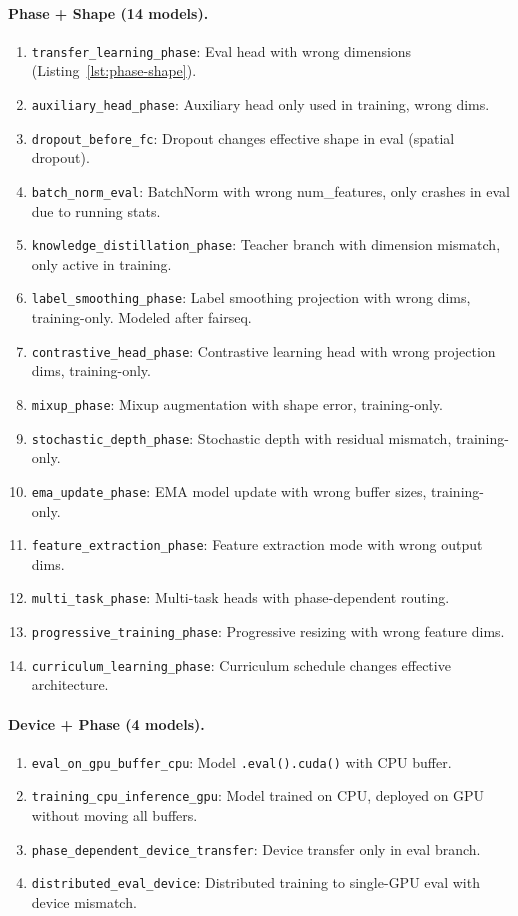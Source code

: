 \documentclass[10pt]{article}
\theoremstyle{plain}
\theoremstyle{definition}
\theoremstyle{remark}
\begin{document}
\paragraph{Phase + Shape (14 models).}
\begin{enumerate}[nosep,leftmargin=2em]
  \item \texttt{transfer\_learning\_phase}: Eval head with wrong
    dimensions (Listing~\ref{lst:phase-shape}).
  \item \texttt{auxiliary\_head\_phase}: Auxiliary head only used in
    training, wrong dims.
  \item \texttt{dropout\_before\_fc}: Dropout changes effective
    shape in eval (spatial dropout).
  \item \texttt{batch\_norm\_eval}: BatchNorm with wrong num\_features,
    only crashes in eval due to running stats.
  \item \texttt{knowledge\_distillation\_phase}: Teacher branch with
    dimension mismatch, only active in training.
  \item \texttt{label\_smoothing\_phase}: Label smoothing projection
    with wrong dims, training-only.  Modeled after fairseq.
  \item \texttt{contrastive\_head\_phase}: Contrastive learning head
    with wrong projection dims, training-only.
  \item \texttt{mixup\_phase}: Mixup augmentation with shape error,
    training-only.
  \item \texttt{stochastic\_depth\_phase}: Stochastic depth with
    residual mismatch, training-only.
  \item \texttt{ema\_update\_phase}: EMA model update with wrong
    buffer sizes, training-only.
  \item \texttt{feature\_extraction\_phase}: Feature extraction mode
    with wrong output dims.
  \item \texttt{multi\_task\_phase}: Multi-task heads with phase-dependent routing.
  \item \texttt{progressive\_training\_phase}: Progressive resizing
    with wrong feature dims.
  \item \texttt{curriculum\_learning\_phase}: Curriculum schedule
    changes effective architecture.
\end{enumerate}

\paragraph{Device + Phase (4 models).}
\begin{enumerate}[nosep,leftmargin=2em]
  \item \texttt{eval\_on\_gpu\_buffer\_cpu}: Model \texttt{.eval().cuda()}
    with CPU buffer.
  \item \texttt{training\_cpu\_inference\_gpu}: Model trained on CPU,
    deployed on GPU without moving all buffers.
  \item \texttt{phase\_dependent\_device\_transfer}: Device transfer
    only in eval branch.
  \item \texttt{distributed\_eval\_device}: Distributed training to
    single-GPU eval with device mismatch.
\end{enumerate}
\end{document}
